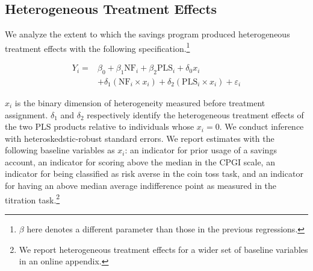 \documentclass[11pt]{article}
\begin{document}






	\subsection{Heterogeneous Treatment Effects}

		We analyze the extent to which the savings program produced heterogeneous treatment effects with the following specification.\footnote{$\beta$ here denotes a different parameter than those in the previous regressions.}

		\begin{equation} \begin{split}
		Y_{i} = & \beta_{0} + \beta_{1}\text{NF}_{i} + \beta_{2}\text{PLS}_{i} + \delta_{0}x_{i} \\
					& + \delta_{1}(\text{NF}_{i} \times x_{i}) + \delta_{2}(\text{PLS}_{i} \times x_{i}) + \varepsilon_{i}
		\end{split} \label{eq:heteffect} \end{equation}

		$x_{i}$ is the binary dimension of heterogeneity measured before treatment assignment. $\delta_{1}$ and $\delta_{2}$ respectively identify the heterogeneous treatment effects of the two PLS products relative to individuals whose $x_{i} = 0$. We conduct inference with heteroskedstic-robust standard errors. We report estimates with the following baseline variables as $x_{i}$: an indicator for prior usage of a savings account, an indicator for scoring above the median in the CPGI scale, an indicator for being classified as risk averse in the coin toss task, and an indicator for having an above median average indifference point as measured in the titration task.\footnote{We report heterogeneous treatment effects for a wider set of baseline variables in an online appendix.}
\end{document}

